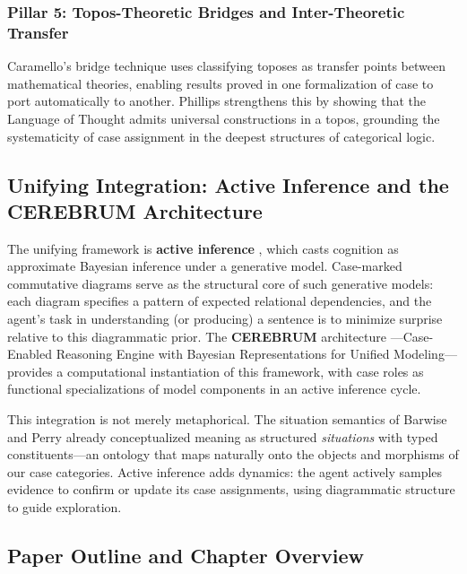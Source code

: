 \documentclass[
]{article}
\numberwithin{equation}{section}
\begin{document}
\subsubsection{Pillar 5: Topos-Theoretic Bridges and Inter-Theoretic
Transfer}\label{pillar-5-topos-theoretic-bridges-and-inter-theoretic-transfer}

Caramello's
\citetext{\citeyear{caramello2016bridges}; \citeyear{caramello2021five}; \citeyear{caramello2023syntactic}}
bridge technique uses classifying toposes as transfer points between
mathematical theories, enabling results proved in one formalization of
case to port automatically to another. Phillips
\citeyearpar{phillips2024lot} strengthens this by showing that the
Language of Thought admits universal constructions in a topos, grounding
the systematicity of case assignment in the deepest structures of
categorical logic.

\subsection{Unifying Integration: Active Inference and the CEREBRUM
Architecture}\label{unifying-integration-active-inference-and-the-cerebrum-architecture}

The unifying framework is \textbf{active inference}
\citep{friston2017active}, which casts cognition as approximate Bayesian
inference under a generative model. Case-marked commutative diagrams
serve as the structural core of such generative models: each diagram
specifies a pattern of expected relational dependencies, and the agent's
task in understanding (or producing) a sentence is to minimize surprise
relative to this diagrammatic prior. The \textbf{CEREBRUM} architecture
\citep{friedman2024cerebrum}---Case-Enabled Reasoning Engine with
Bayesian Representations for Unified Modeling---provides a computational
instantiation of this framework, with case roles as functional
specializations of model components in an active inference cycle.

This integration is not merely metaphorical. The situation semantics of
Barwise and Perry \citeyearpar{barwise1983situations} already
conceptualized meaning as structured \emph{situations} with typed
constituents---an ontology that maps naturally onto the objects and
morphisms of our case categories. Active inference adds dynamics: the
agent actively samples evidence to confirm or update its case
assignments, using diagrammatic structure to guide exploration.

\subsection{Paper Outline and Chapter
Overview}\label{paper-outline-and-chapter-overview}
\end{document}
